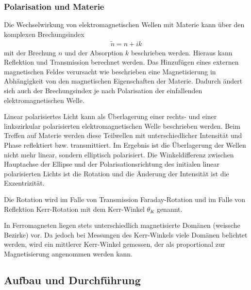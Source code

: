   \subsubsection{Polarisation und Materie}
  Die Wechselwirkung von elektromagnetischen Wellen mit Materie kann über den komplexen Brechungsindex
	\begin{align*}
		\tilde{n} = n + ik
	\end{align*}
  mit der Brechung $n$ und der Absorption $k$ beschrieben werden.
  Hieraus kann Reflektion und Transmission berechnet werden.
  Das Hinzufügen eines externen magnetischen Feldes verursacht wie beschrieben eine Magnetisierung in Abhängigkeit von den magnetischen Eigenschaften der Materie.
  Dadurch ändert sich auch der Brechungsindex je nach Polarisation der einfallenden elektromagnetischen Welle.

  Linear polarisiertes Licht kann als Überlagerung einer rechts- und einer linkszirkular polarisierten elektromagnetischen Welle beschrieben werden.
  Beim Treffen auf Materie werden diese Teilwellen mit unterschiedlicher Intensität und Phase reflektiert bzw. transmittiert.
	Im Ergebnis ist die Überlagerung der Wellen nicht mehr linear, sondern elliptisch polarisiert.
	Die Winkeldifferenz zwischen Hauptachse der Ellipse und der Polarisationsrichtung des initialen linear polarisierten Lichts ist die Rotation und die Änderung der Intensität ist die Exzentrizität.

  Die Rotation wird im Falle von Transmission Faraday-Rotation und im Falle von Reflektion Kerr-Rotation mit dem Kerr-Winkel $\theta_K$ genannt.

  In Ferromagneten liegen stets unterschiedlich magnetisierte Domänen (weissche Bezirke) vor.
  Da jedoch bei Messungen des Kerr-Winkels viele Domänen belichtet werden, wird ein mittlerer Kerr-Winkel gemessen, der als proportional zur Magnetisierung angenommen werden kann.

\subsection{Aufbau und Durchführung}

